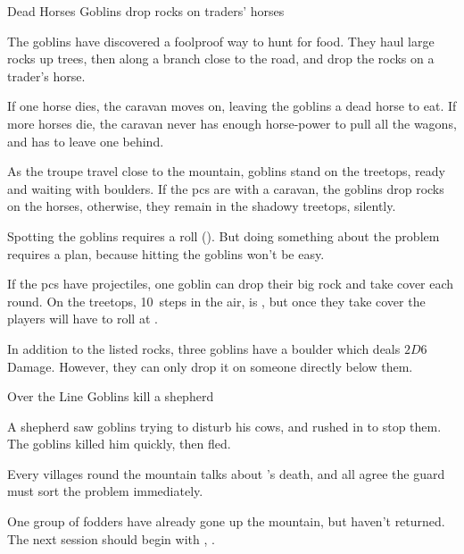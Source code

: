 \begin{multicols}{2}
{  %
  {Dead Horses}%
  {Goblins drop rocks on traders' horses}%

  \begin{exampletext}
    The goblins have discovered a foolproof way to hunt for food.
    They haul large rocks up trees, then along a branch close to the road, and drop the rocks on a trader's horse.

    If one horse dies, the caravan moves on, leaving the goblins a dead horse to eat.
    If more horses die, the caravan never has enough horse-power to pull all the wagons, and has to leave one behind.
  \end{exampletext}

  As the troupe travel close to the mountain, goblins stand on the treetops, ready and waiting with boulders.
  If the \glspl{pc} are with a caravan, the goblins drop rocks on the horses, otherwise, they remain in the shadowy treetops, silently.

  Spotting the goblins requires a  roll (\tn[10]).
  But doing something about the problem requires a plan, because hitting the goblins won't be easy.

  If the \glspl{pc} have \glspl{projectile}, one goblin can drop their big rock and take cover each \gls{round}.
  On the treetops, 10~\glspl{step} in the air, is \tn[9], but once they take cover the players will have to roll at \tn[11].

  \goblin

  \goblin

  In addition to the listed rocks, three goblins have a boulder which deals $2D6$ Damage.
  However, they can only drop it on someone directly below them.

  {Over the Line}%
  {Goblins kill a shepherd}%

  \begin{exampletext}
    A shepherd saw goblins trying to disturb his cows, and rushed in to stop them.
    The goblins killed him quickly, then fled.
  \end{exampletext}

  Every \glspl{village} round the mountain talks about \composeHumanName's death, and all agree the \gls{guard} must sort the problem immediately.

  One group of \glspl{fodder} have already gone up the mountain, but haven't returned.
  The next session should begin with , .
}


\end{multicols}
